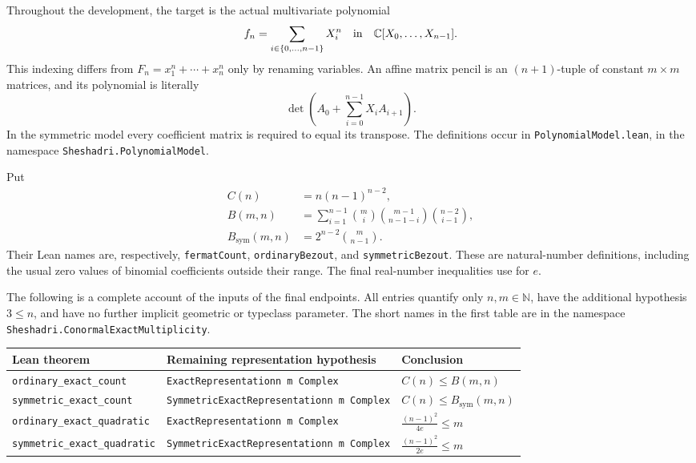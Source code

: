Throughout the development, the target is the actual multivariate polynomial
\[
 f_n=\sum_{i\in\{0,\ldots,n-1\}}X_i^n
 \quad\text{in}\quad \mathbb{C}[X_0,\ldots,X_{n-1}].
\]
This indexing differs from $F_n=x_1^n+\cdots+x_n^n$ only by renaming variables.
An affine matrix pencil is an $(n+1)$-tuple of constant $m\times m$ matrices,
and its polynomial is literally
\[
 \det\left(A_0+\sum_{i=0}^{n-1}X_iA_{i+1}\right).
\]
In the symmetric model every coefficient matrix is required to equal its
transpose.  The definitions occur in \nolinkurl{PolynomialModel.lean}, in
the namespace \nolinkurl{Sheshadri.PolynomialModel}.

Put
\begin{align*}
 C(n)&=n(n-1)^{n-2},\\
 B(m,n)&=\sum_{i=1}^{n-1}
   \binom mi\binom{m-1}{n-1-i}\binom{n-2}{i-1},\\
 B_{\mathrm{sym}}(m,n)&=2^{n-2}\binom m{n-1}.
\end{align*}
Their Lean names are, respectively, \nolinkurl{fermatCount},
\nolinkurl{ordinaryBezout}, and \nolinkurl{symmetricBezout}.  These are
natural-number definitions, including the usual zero values of binomial
coefficients outside their range.  The final real-number inequalities use
\texttt{} for $e$.

The following is a complete account of the inputs of the final endpoints.
All entries quantify only $n,m\in\mathbb N$, have the additional hypothesis
$3\leq n$, and have no further implicit geometric or typeclass parameter.
The short names in the first table are in the namespace
\nolinkurl{Sheshadri.ConormalExactMultiplicity}.

\begingroup\small
\begin{longtable}{@{}>{\raggedright\arraybackslash}p{}>{\raggedright\arraybackslash}p{}>{\raggedright\arraybackslash}p{}@{}}
\toprule
Lean theorem & Remaining representation hypothesis & Conclusion\\
\midrule
\endhead
\nolinkurl{ordinary_exact_count} &
\nolinkurl{ExactRepresentation}\newline\texttt{n m Complex} & $C(n)\leq B(m,n)$\\[2pt]
\nolinkurl{symmetric_exact_count} &
\nolinkurl{SymmetricExactRepresentation}\newline\texttt{n m Complex} &
$C(n)\leq B_{\mathrm{sym}}(m,n)$\\[2pt]
\nolinkurl{ordinary_exact_quadratic} &
\nolinkurl{ExactRepresentation}\newline\texttt{n m Complex} &
$\displaystyle\frac{(n-1)^2}{4e}\leq m$\\[5pt]
\nolinkurl{symmetric_exact_quadratic} &
\nolinkurl{SymmetricExactRepresentation}\newline\texttt{n m Complex} &
$\displaystyle\frac{(n-1)^2}{2e}\leq m$\\
\bottomrule
\end{longtable}
\endgroup

